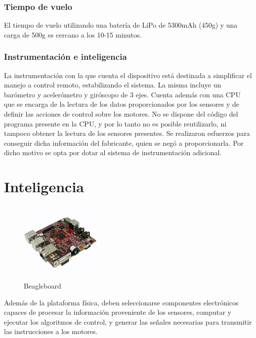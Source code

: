 \documentclass[main]{subfiles}
\begin{document}
\subsubsection*{Tiempo de vuelo}

El tiempo de vuelo utilizando una bater\'ia de LiPo de 5300mAh (450g) y una carga de 500g es cercano a los 10-15 minutos.

\subsubsection*{Instrumentaci\'on e inteligencia}

	La instrumentaci\'on con la que cuenta el dispositivo est\'a destinada a simplificar el manejo a control remoto, estabilizando el sistema. La misma incluye un bar\'ometro y aceler\'ometro y gir\'oscopo de 3 ejes. Cuenta adem\'as con una CPU que se encarga de la lectura de los datos proporcionados por los sensores y de definir las acciones de control sobre los motores. No se dispone del c\'odigo del programa presente en la CPU, y por lo tanto no es posible reutilizarlo, ni tampoco obtener la lectura de los sensores presentes. Se realizaron esfuerzos para conseguir dicha informaci\'on del fabricante, quien se neg\'o a proporcionarla. Por dicho motivo se opta por dotar al sistema de instrumentaci\'on adicional. 

\section{Inteligencia}
\begin{figure}
\vspace{-30pt}
	\centering
	\includegraphics[width=0.35\textwidth]{./pics_eleccion_hardware/beagle.pdf}
\vspace{-30pt}
	\caption{Beagleboard}
	\label{fig:beagleboard}
\end{figure}


Adem\'as de la plataforma f\'isica, deben seleccionarse componentes electr\'onicos capaces de procesar la informaci\'on proveniente de los sensores, computar y ejecutar los algoritmos de control, y generar las se\~nales necesarias para transmitir las instrucciones a los motores.\\
\end{document}
